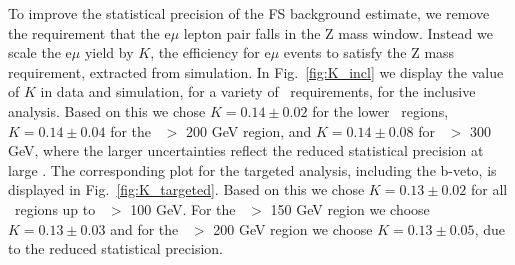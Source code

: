 To improve the statistical precision of the FS background estimate, we remove the requirement that the e$\mu$ lepton pair falls in the Z mass window.
Instead we scale the e$\mu$ yield by $K$, the efficiency for e$\mu$ events to satisfy the Z mass requirement, extracted from simulation. In Fig.~\ref{fig:K_incl}
we display the value of $K$ in data and simulation, for a variety of \MET\ requirements, for the inclusive analysis. 
Based on this we chose $K=0.14\pm0.02$ for the lower \MET\ regions, $K=0.14\pm0.04$ for the \MET\ $>$ 200 GeV region, and $K=0.14\pm0.08$ for \MET\ $>$ 300 GeV,
where the larger uncertainties reflect the reduced statistical precision at large \MET.
The corresponding plot for the targeted analysis, including the b-veto, is displayed in Fig.~\ref{fig:K_targeted}.
Based on this we chose $K=0.13\pm0.02$ for all \MET\ regions up to  \MET\ $>$ 100 GeV. 
For the \MET\ $>$ 150 GeV region we choose $K=0.13\pm0.03$
and for the \MET\ $>$ 200 GeV region we choose $K=0.13\pm0.05$, 
due to the reduced  statistical precision.

